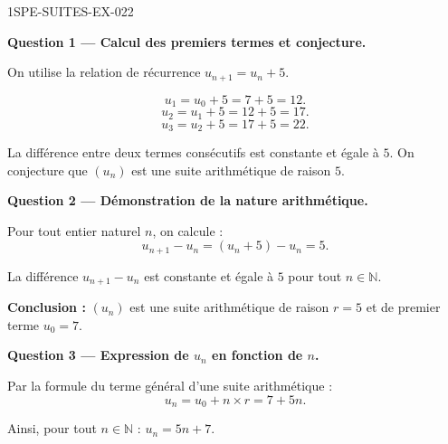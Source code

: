 \begin{corrige}{1SPE-SUITES-EX-022}

\textbf{Question 1 — Calcul des premiers termes et conjecture.}

On utilise la relation de récurrence $u_{n+1} = u_n + 5$.

\[
  u_1 = u_0 + 5 = 7 + 5 = 12.
\]
\[
  u_2 = u_1 + 5 = 12 + 5 = 17.
\]
\[
  u_3 = u_2 + 5 = 17 + 5 = 22.
\]


La différence entre deux termes consécutifs est constante et égale à $5$. On conjecture que $(u_n)$ est une suite arithmétique de raison $5$.

\medskip
\textbf{Question 2 — Démonstration de la nature arithmétique.}

Pour tout entier naturel $n$, on calcule :
\[
  u_{n+1} - u_n = (u_n + 5) - u_n = 5.
\]


La différence $u_{n+1} - u_n$ est constante et égale à $5$ pour tout $n \in \mathbb{N}$.

\textbf{Conclusion :} $(u_n)$ est une suite arithmétique de raison $r = 5$ et de premier terme $u_0 = 7$.

\medskip
\textbf{Question 3 — Expression de $u_n$ en fonction de $n$.}

Par la formule du terme général d'une suite arithmétique :
\[
  u_n = u_0 + n \times r = 7 + 5n.
\]


Ainsi, pour tout $n \in \mathbb{N}$ : $\boxed{u_n = 5n + 7}$.


\end{corrige}
